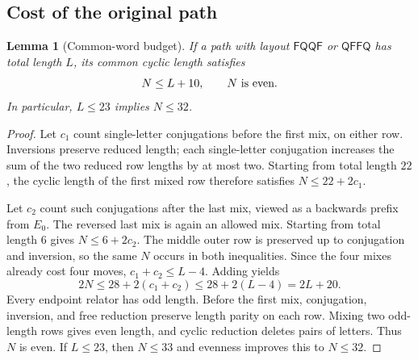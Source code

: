 \documentclass[11pt,a4paper]{article}
\newtheorem{lemma}[theorem]{Lemma}
\theoremstyle{definition}\newtheorem{definition}[theorem]{Definition}
\theoremstyle{remark}\newtheorem{remark}[theorem]{Remark}
\newcommand{\F}{\mathsf F}
\newcommand{\Q}{\mathsf Q}
\begin{document}
\subsection{Cost of the original path}
\begin{lemma}[Common-word budget]\label{lem:cost}
If a path with layout $\F\Q\Q\F$ or $\Q\F\F\Q$ has total length $L$, its common cyclic length satisfies
\[
 N\le L+10,\qquad N\ \hbox{is even}.
\]
In particular, $L\le23$ implies $N\le32$.
\end{lemma}
\begin{proof}
Let $c_1$ count single-letter conjugations before the first mix, on either row. Inversions preserve reduced length; each single-letter conjugation increases the sum of the two reduced row lengths by at most two. Starting from total length $22$, the cyclic length of the first mixed row therefore satisfies $N\le22+2c_1$.

Let $c_2$ count such conjugations after the last mix, viewed as a backwards prefix from $E_0$. The reversed last mix is again an allowed mix. Starting from total length $6$ gives $N\le6+2c_2$. The middle outer row is preserved up to conjugation and inversion, so the same $N$ occurs in both inequalities. Since the four mixes already cost four moves, $c_1+c_2\le L-4$. Adding yields
\[
2N\le28+2(c_1+c_2)\le28+2(L-4)=2L+20.
\]
Every endpoint relator has odd length. Before the first mix, conjugation, inversion, and free reduction preserve length parity on each row. Mixing two odd-length rows gives even length, and cyclic reduction deletes pairs of letters. Thus $N$ is even. If $L\le23$, then $N\le33$ and evenness improves this to $N\le32$.
\end{proof}
\end{document}
